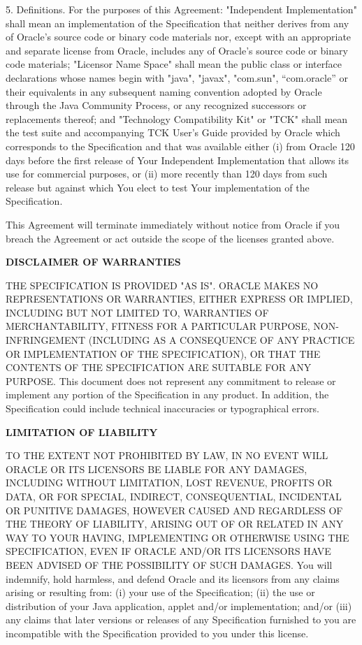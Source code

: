 \begin{flushleft}
5. Definitions. For the purposes of this Agreement:  "Independent Implementation" shall mean an implementation of the Specification that neither derives from any of Oracle's  source code or binary code materials nor, except with an appropriate and separate license from Oracle, includes any of Oracle's  source code or binary code materials; "Licensor Name Space" shall mean the public class or interface declarations whose names begin with "java", "javax", "com.sun", “com.oracle”  or their equivalents in any subsequent naming convention adopted by Oracle  through the Java Community Process, or any recognized successors or replacements thereof; and "Technology Compatibility Kit" or "TCK" shall mean the test suite and accompanying TCK User's Guide provided by Oracle  which corresponds to the Specification and that was available either (i) from Oracle 120 days before the first release of Your Independent Implementation that allows its use for commercial purposes, or (ii) more recently than 120 days from such release but against which You elect to test Your implementation of the Specification.

This Agreement will terminate immediately without notice from Oracle if you breach the Agreement or act outside the scope of the licenses granted above.

{\bfseries DISCLAIMER OF WARRANTIES}

THE SPECIFICATION IS PROVIDED "AS IS". ORACLE MAKES NO REPRESENTATIONS OR WARRANTIES, EITHER EXPRESS OR IMPLIED, INCLUDING BUT NOT LIMITED TO, WARRANTIES OF MERCHANTABILITY, FITNESS FOR A PARTICULAR PURPOSE, NON-INFRINGEMENT (INCLUDING AS A CONSEQUENCE OF ANY PRACTICE OR IMPLEMENTATION OF THE SPECIFICATION), OR THAT THE CONTENTS OF THE SPECIFICATION ARE SUITABLE FOR ANY PURPOSE.  This document does not represent any commitment to release or implement any portion of the Specification in any product. In addition, the Specification could include technical inaccuracies or typographical errors.

{\bfseries LIMITATION OF LIABILITY}

TO THE EXTENT NOT PROHIBITED BY LAW, IN NO EVENT WILL ORACLE OR ITS LICENSORS BE LIABLE FOR ANY DAMAGES, INCLUDING WITHOUT LIMITATION, LOST REVENUE, PROFITS OR DATA, OR FOR SPECIAL, INDIRECT, CONSEQUENTIAL, INCIDENTAL OR PUNITIVE DAMAGES, HOWEVER CAUSED AND REGARDLESS OF THE THEORY OF LIABILITY, ARISING OUT OF OR RELATED IN ANY WAY TO YOUR HAVING, IMPLEMENTING OR OTHERWISE USING  THE SPECIFICATION, EVEN IF ORACLE AND/OR ITS LICENSORS HAVE BEEN ADVISED OF THE POSSIBILITY OF SUCH DAMAGES. 
You will indemnify, hold harmless, and defend Oracle and its licensors from any claims arising or resulting from: (i) your use of the Specification; (ii) the use or distribution of your Java application, applet and/or implementation; and/or (iii) any claims that later versions or releases of any Specification furnished to you are incompatible with the Specification provided to you under this license. 


\end{flushleft}
